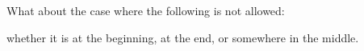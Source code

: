   What about the case where the following is not allowed:

whether it is at the beginning, at the end, or somewhere in the middle.
